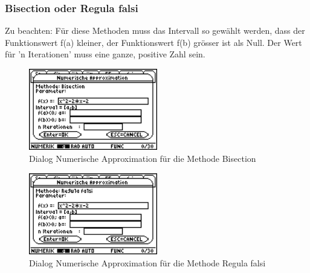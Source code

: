 \documentclass[a4paper,10pt]{scrreprt}
\begin{document}
\subsubsection*{Bisection oder Regula falsi}
Zu beachten: F\"ur diese Methoden muss das Intervall so gew\"ahlt werden, dass der Funktions­wert f(a) kleiner, der Funktions­wert f(b) gr\"osser ist als Null. Der Wert f\"ur 'n Iterationen' muss eine ganze, positive Zahl sein.
\begin{figure}[h]
  \centering
  \includegraphics[width=0.5\textwidth]{img/nummeth_image018.png}
  \caption{Dialog Numerische Approximation f\"ur die Methode Bisection}
  \label{fig:ParameterApproximationBisection}
\end{figure}
\begin{figure}[h]
  \centering
  \includegraphics[width=0.5\textwidth]{img/nummeth_image020.png}
  \caption{Dialog Numerische Approximation f\"ur die Methode Regula falsi}
  \label{fig:ParameterApproximationRegulaFalsi}
\end{figure}

\newpage
\end{document}
